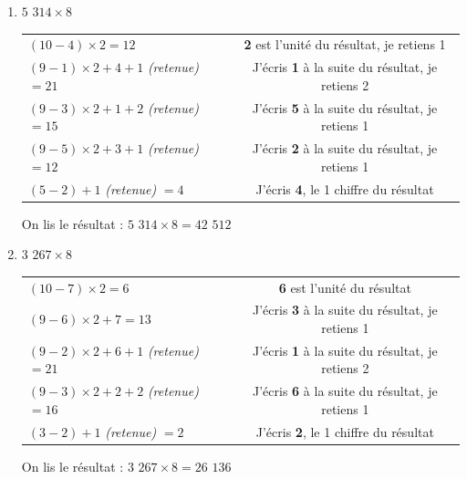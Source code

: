 \documentclass[a4paper, twoside]{article}
\begin{document}
		\begin{small}
		\begin{enumerate}

			\item $5$ $314 \times 8$
			
			\begin{tabular}{l|c}

				$(10 - 4) \times 2 = 12$ & \textbf{2} est l'unité du résultat, je retiens 1
				
				\tabularnewline
				
				$ (9 - 1) \times 2 + 4 + 1$ \textit{(retenue)} $= 21$ & J'écris \textbf{1} à la suite du résultat, je retiens 2
				
				\tabularnewline
				
				$ (9 - 3) \times 2 + 1 + 2$ \textit{(retenue)} $= 15$ & J'écris \textbf{5} à la suite du résultat, je retiens 1
				
				\tabularnewline
				
				$ (9 - 5) \times 2 + 3 + 1$ \textit{(retenue)} $= 12$ & J'écris \textbf{2} à la suite du résultat, je retiens 1
				
				\tabularnewline
				
				$ (5 - 2) + 1$ \textit{(retenue)} $= 4$ & J'écris \textbf{4}, le 1\up{er} chiffre du résultat

			\end{tabular}
			
			On lis le résultat : {\boldmath $5$ $314 \times 8 = 42$ $512$}\\
				
			
			
			
			
			\item $3$ $267 \times 8$
			
			\begin{tabular}{l|c}

				$(10 - 7) \times 2 = 6$ & \textbf{6} est l'unité du résultat
				
				\tabularnewline
				
				$(9 - 6) \times 2 + 7 = 13$ & J'écris \textbf{3} à la suite du résultat, je retiens 1
				
				\tabularnewline
				
				$(9 - 2) \times 2 + 6 + 1$ \textit{(retenue)} $= 21$ & J'écris \textbf{1} à la suite du résultat, je retiens 2
				
				\tabularnewline
				
				$(9 - 3) \times 2 + 2 + 2$ \textit{(retenue)} $= 16$ & J'écris \textbf{6} à la suite du résultat, je retiens 1
				
				\tabularnewline
				
				$(3 - 2) + 1$ \textit{(retenue)} $= 2$ & J'écris \textbf{2}, le 1\up{er} chiffre du résultat
				
			\end{tabular}
			
			On lis le résultat : {\boldmath $3$ $267 \times 8 = 26$ $136$}\\

		\end{enumerate}
		\end{small}
\end{document}
